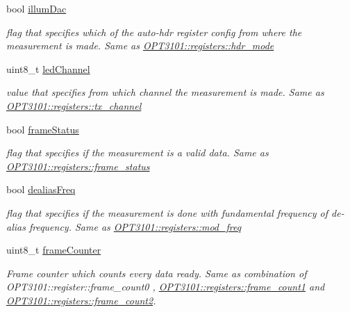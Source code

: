 \begin{DoxyCompactItemize}
bool \mbox{\hyperlink{class_o_p_t3101_1_1frame_data_ada9279b0ee78ff855e95d1e34462cbaf}{illum\+Dac}}
\begin{DoxyCompactList}\small\item\em flag that specifies which of the auto-\/hdr register config from where the measurement is made. Same as \mbox{\hyperlink{class_o_p_t3101_1_1registers_a78e8bc6ad4a84c7d19974ba6c58e329e}{O\+P\+T3101\+::registers\+::hdr\+\_\+mode}} \end{DoxyCompactList}\item 
uint8\+\_\+t \mbox{\hyperlink{class_o_p_t3101_1_1frame_data_adac0d179c89ba3b8b10b0785c80d37fa}{led\+Channel}}
\begin{DoxyCompactList}\small\item\em value that specifies from which channel the measurement is made. Same as \mbox{\hyperlink{class_o_p_t3101_1_1registers_a53518f25f00a5926fda5f0d37ad82fcb}{O\+P\+T3101\+::registers\+::tx\+\_\+channel}} \end{DoxyCompactList}\item 
bool \mbox{\hyperlink{class_o_p_t3101_1_1frame_data_ad291a49c4cfe78bb8de52749d9c0d318}{frame\+Status}}
\begin{DoxyCompactList}\small\item\em flag that specifies if the measurement is a valid data. Same as \mbox{\hyperlink{class_o_p_t3101_1_1registers_ab8c08b83252a06c3c59b4b33b4b1a8ba}{O\+P\+T3101\+::registers\+::frame\+\_\+status}} \end{DoxyCompactList}\item 
bool \mbox{\hyperlink{class_o_p_t3101_1_1frame_data_a7f4b242739da2cabd965a01d1362c38e}{dealias\+Freq}}
\begin{DoxyCompactList}\small\item\em flag that specifies if the measurement is done with fundamental frequency of de-\/alias frequency. Same as \mbox{\hyperlink{class_o_p_t3101_1_1registers_ad0a150fb8c5e1efeae026e76f2bdbc1f}{O\+P\+T3101\+::registers\+::mod\+\_\+freq}} \end{DoxyCompactList}\item 
uint8\+\_\+t \mbox{\hyperlink{class_o_p_t3101_1_1frame_data_a571ec2f70947b37d3597d5ee623367d4}{frame\+Counter}}
\begin{DoxyCompactList}\small\item\em Frame counter which counts every data ready. Same as combination of O\+P\+T3101\+::register\+::frame\+\_\+count0 , \mbox{\hyperlink{class_o_p_t3101_1_1registers_a736858f4b79f2dd5444fc1938148d438}{O\+P\+T3101\+::registers\+::frame\+\_\+count1}} and \mbox{\hyperlink{class_o_p_t3101_1_1registers_a1247368fca5573a9ab4b69d541c53a57}{O\+P\+T3101\+::registers\+::frame\+\_\+count2}}. \end{DoxyCompactList}\item 

\end{DoxyCompactItemize}
